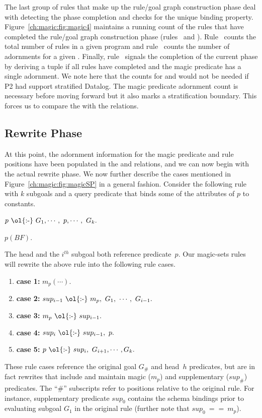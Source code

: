 The last group of rules that make up the rule/goal graph construction phase
deal with detecting the phase completion and checks for the unique binding
property.  Figure~\ref{ch:magic:fig:magic4} maintains a running count of the
rules that have completed the rule/goal graph construction phase
(rules~ and ).  Rule~ counts the total number of
rules in a given program and rule~ counts the number of adornments for
a given .  Finally, rule~ signals the completion of the
current phase by deriving a  tuple if all rules have
completed and the magic predicate has a single adornment.  We note here that
the counts for  and  would not be needed
if P2 had support stratified Datalog.  The magic predicate adornment count is
necessary before moving forward but it also marks a stratification boundary.  This
forces us to compare the  with the 
relations.


\subsection{Rewrite Phase}
\label{ch:magic:sec:rewrite}
 
At this point, the adornment information for the magic predicate and rule positions
have been populated in the  and  relations, and we can now
begin with the actual rewrite phase.  We now further describe the cases mentioned
in Figure~\ref{ch:magic:fig:magicSP} in a general fashion. Consider the following rule with
$k$ subgoals and a query predicate that binds some of the attributes of $p$ to
constants.
\begin{trivlist}
\ssp
\item $p\ \text{\ol{:-}}\ G_1, \cdots,\ p, \cdots,\ G_k.$
\item $p(BF).$
\end{trivlist}
The head and the $i^{th}$ subgoal both reference predicate~$p$.  Our magic-sets
rules will rewrite the above rule into the following rule cases.
\begin{enumerate}
\ssp
\item {\bf case 1:} $m_p(\cdots).$ 
\item {\bf case 2:} $sup_{i-1}\ \text{\ol{:-}}\ m_p,\ G_1,\ \cdots,\ G_{i-1}.$ 
\item {\bf case 3:} $m_p\ \text{\ol{:-}}\ sup_{i-1}.$ 
\item {\bf case 4:} $sup_i\ \text{\ol{:-}}\ sup_{i-1},\ p.$ 
\item {\bf case 5:} $p\ \text{\ol{:-}}\ sup_i,\ G_{i+1}, \cdots, G_k.$ 
\end{enumerate}
These rule cases reference the original goal $G_{\#}$ and head~$h$ predicates,
but are in fact rewrites that include and maintain magic ($m_p$) and
supplementary ($sup_{\#}$) predicates.  The ``\#'' subscripts refer to
positions relative to the original rule.  For instance, supplementary predicate
$sup_0$ contains the schema bindings prior to evaluating subgoal $G_1$ in the
original rule (further note that $sup_0\ ==\ m_p$).

